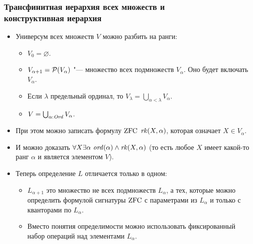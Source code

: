 \documentclass[10pt]{beamer}
\begin{document}
\begin{frame}
    \frametitle{Трансфинитная иерархия всех множеств и \\ конструктивная иерархия}
    \begin{itemize}
        \item Универсум всех множеств $V$ можно разбить на ранги:
        \begin{itemize}
            \item $V_0 = \varnothing$.
            \item $V_{\alpha+1} = \mathcal{P}({V_\alpha})$ "--- множество всех подмножеств $V_\alpha$. Оно будет включать $V_\alpha$.
            \item Если $\lambda$ предельный ординал, то $V_\lambda = \bigcup_{\alpha < \lambda} V_\alpha$.
            \item $V = \bigcup_{\alpha : \mathit{Ord}} V_\alpha$.
        \end{itemize}
        \item При этом можно записать формулу $\mathrm{ZFC}$ $\mathit{rk}(X, \alpha)$, которая означает $X \in V_\alpha$.
        \item И можно доказать $\forall X \exists \alpha~\mathit{ord}(\alpha) \land \mathit{rk}(X, \alpha)$ (то есть любое $X$ имеет какой-то ранг $\alpha$ и является элементом $V$).
        \pause
        \item Теперь определение $L$ отличается только в одном:
        \begin{itemize}
            \item $L_{\alpha+1}$ это множество не всех подмножеств $L_\alpha$, а тех, которые можно определить формулой сигнатуры $\mathrm{ZFC}$ с параметрами из $L_\alpha$ и только с кванторами по $L_\alpha$.
            \item Вместо понятия определимости можно использовать фиксированный набор операций над элементами $L_\alpha$.
        \end{itemize}
    \end{itemize}
\end{frame}
\end{document}
